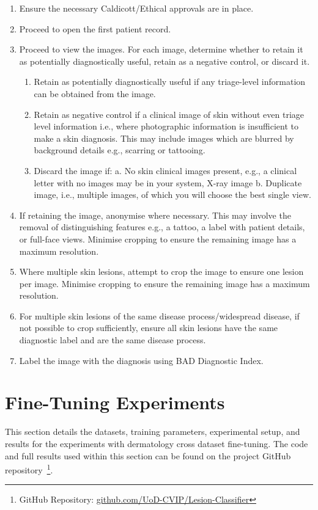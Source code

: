 \begin{enumerate}
	\item Ensure the necessary Caldicott/Ethical approvals are in place. 
	\item Proceed to open the first patient record.
	\item Proceed to view the images. For each image, determine whether to retain it as potentially diagnostically useful, retain as a negative control, or discard it.
	\begin{enumerate}
		\item Retain as potentially diagnostically useful if any triage-level information can be obtained from the image.
		\item Retain as negative control if a clinical image of skin without even triage level information i.e., where photographic information is insufficient to make a skin diagnosis. This may include images which are blurred by background details e.g., scarring or tattooing.
		\item Discard the image if: a. No skin clinical images present, e.g., a clinical letter with no images may be in your system, X-ray image b. Duplicate image, i.e., multiple images, of which you will choose the best single view.
	\end{enumerate}
	\item If retaining the image, anonymise where necessary. This may involve the removal of distinguishing features e.g., a tattoo, a label with patient details, or full-face views. Minimise cropping to ensure the remaining image has a maximum resolution. 
	\item Where multiple skin lesions, attempt to crop the image to ensure one lesion per image. Minimise cropping to ensure the remaining image has a maximum resolution.
	\item For multiple skin lesions of the same disease process/widespread disease, if not possible to crop sufficiently, ensure all skin lesions have the same diagnostic label and are the same disease process.
	\item Label the image with the diagnosis using BAD Diagnostic Index.
\end{enumerate}


\newpage
\section{Fine-Tuning Experiments}
\label{sec:generalisation_experiments}
This section details the datasets, training parameters, experimental setup, and results for the experiments with dermatology cross dataset fine-tuning. The code and full results used within this section can be found on the project GitHub repository~\footnote{GitHub Repository: \url{github.com/UoD-CVIP/Lesion-Classifier}}.

